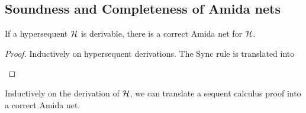 \subsection{Soundness and Completeness of Amida nets}

 \begin{theorem}
  If a hypersequent $\mathcal{H}$ is derivable,
  there is a correct Amida net for $\mathcal{H}$.
 \end{theorem}
 \begin{proof}
  Inductively on hypersequent derivations.
  The Sync rule is translated into
   \begin{center}
   \end{center}
 \end{proof}
 \begin{theorem}
  Inductively on the derivation of $\mathcal{H}$,
  we can translate a sequent calculus proof into a correct Amida net.
 \end{theorem}
